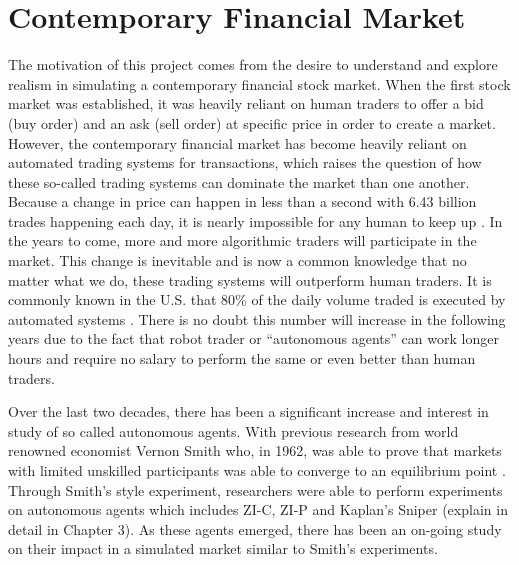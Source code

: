 
\graphicspath{ {./images/} }



% 

\section{Contemporary Financial Market} 
The motivation of this project comes from the desire to understand and explore realism in simulating a contemporary financial stock market. When the first stock market was established, it was heavily reliant on human traders to offer a bid (buy order) and an ask (sell order) at specific price in order to create a market. However, the contemporary financial market has become heavily reliant on automated trading systems for transactions, which raises the question of how these so-called trading systems can dominate the market than one another. Because a change in price can happen in less than a second with 6.43 billion trades happening each day, it is nearly impossible for any human to keep up \cite{dailytrade}. In the years to come, more and more algorithmic traders will participate in the market. This change is inevitable and is now a common knowledge that no matter what we do, these trading systems will outperform human traders. It is commonly known in the U.S. that 80\% of the daily volume traded is executed by automated systems \cite{percentAgent}. There is no doubt this number will increase in the following years due to the fact that robot trader or ``autonomous agents” can work longer hours and require no salary to perform the same or even better than human traders. 

Over the last two decades, there has been a significant increase and interest in study of so called autonomous agents. With previous research from world renowned economist Vernon Smith who, in 1962, was able to prove that markets with limited unskilled participants was able to converge to an equilibrium point \cite{smith1962}. Through Smith’s style experiment, researchers were able to perform experiments on autonomous agents which includes ZI-C, ZI-P and Kaplan’s Sniper (explain in detail in Chapter 3). As these agents emerged, there has been an on-going study on their impact in a simulated market similar to Smith's experiments.  


